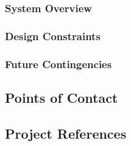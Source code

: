 \documentclass[11pt,a4paper]{article}
\begin{document}
\subsubsection{System Overview}

\subsubsection{Design Constraints}

\subsubsection{Future Contingencies}

\subsection{Points of Contact}


\subsection{Project References}
\end{document}
